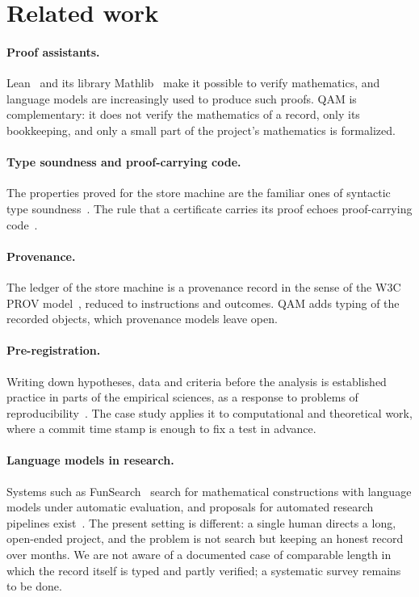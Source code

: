 \section{Related work}\label{sec:related}

\paragraph{Proof assistants.}  Lean~\cite{lean4} and its library Mathlib~\cite{mathlib} make it possible to verify mathematics, and language
models are increasingly used to produce such proofs.  QAM is complementary: it does not verify the mathematics of a record, only its
bookkeeping, and only a small part of the project's mathematics is formalized.

\paragraph{Type soundness and proof-carrying code.}  The properties proved for the store machine are the familiar ones of syntactic type
soundness~\cite{wright,pierce}.  The rule that a certificate carries its proof echoes proof-carrying code~\cite{necula}.

\paragraph{Provenance.}  The ledger of the store machine is a provenance record in the sense of the W3C PROV model~\cite{prov}, reduced to
instructions and outcomes.  QAM adds typing of the recorded objects, which provenance models leave open.

\paragraph{Pre-registration.}  Writing down hypotheses, data and criteria before the analysis is established practice in parts of the
empirical sciences, as a response to problems of reproducibility~\cite{nosek,baker}.  The case study applies it to computational and
theoretical work, where a commit time stamp is enough to fix a test in advance.

\paragraph{Language models in research.}  Systems such as FunSearch~\cite{funsearch} search for mathematical constructions with language models
under automatic evaluation, and proposals for automated research pipelines exist~\cite{aiscientist}.  The present setting is different: a
single human directs a long, open-ended project, and the problem is not search but keeping an honest record over months.  We are not aware of a
documented case of comparable length in which the record itself is typed and partly verified; a systematic survey remains to be done.
